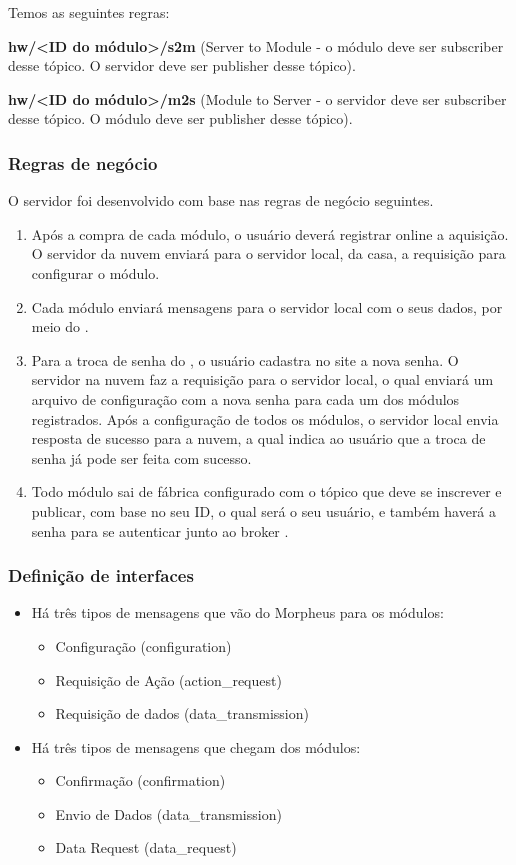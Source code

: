 Temos as seguintes regras:

\textbf{hw/\textless ID do módulo\textgreater /s2m} (Server to Module - o módulo deve ser subscriber desse tópico. O servidor deve ser publisher desse tópico).

\textbf{hw/\textless ID do módulo\textgreater /m2s} (Module to Server - o servidor deve ser subscriber desse tópico. O módulo deve ser publisher desse tópico).

\subsubsection{Regras de negócio}
O servidor foi desenvolvido com base nas regras de negócio seguintes.
\begin{enumerate}
\item Após a compra de cada módulo, o usuário deverá registrar online a aquisição. O servidor da nuvem enviará para o servidor local, da casa, a requisição para configurar o módulo.
\item Cada módulo enviará mensagens para o servidor local com o seus dados, por meio do \wmqtt.
\item Para a troca de senha do \wwifi, o usuário cadastra no site a nova senha. O servidor na nuvem faz a requisição para o servidor local, o qual enviará um arquivo de configuração com a nova senha para cada um dos módulos registrados. Após a configuração de todos os módulos, o servidor local envia resposta de sucesso para a nuvem, a qual indica ao usuário que a troca de senha já pode ser feita com sucesso.
\item Todo módulo sai de fábrica configurado com o tópico que deve se inscrever e publicar, com base no seu ID, o qual será o seu usuário, e também haverá a senha para se autenticar junto ao broker \wmqtt.
\end{enumerate}

\subsubsection{Definição de interfaces}
\begin{itemize}
\item Há três tipos de mensagens que vão do Morpheus para os módulos:
  \begin{itemize}
  \item Configuração (configuration)
  \item Requisição de Ação (action\_request)
  \item Requisição de dados (data\_transmission)
  \end{itemize}
\item Há três tipos de mensagens que chegam dos módulos:
  \begin{itemize}
  \item Confirmação (confirmation)
  \item Envio de Dados (data\_transmission)
  \item Data Request (data\_request)
  \end{itemize}
\end{itemize}

